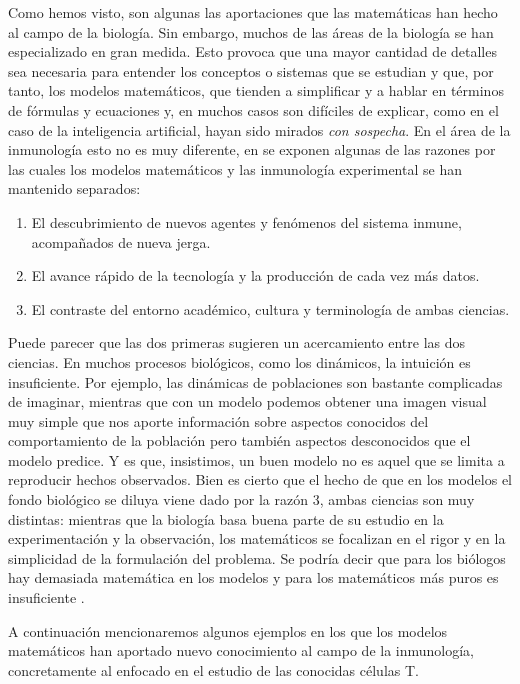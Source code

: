 Como hemos visto, son algunas las aportaciones que las matemáticas han hecho al campo de la biología. Sin embargo, muchos de las áreas de la biología se han especializado en gran medida. Esto provoca que una mayor cantidad de detalles sea necesaria para entender los conceptos o sistemas que se estudian y que, por tanto, los modelos matemáticos, que tienden a simplificar y a hablar en términos de fórmulas y ecuaciones y, en muchos casos son difíciles de explicar, como en el caso de la inteligencia artificial, hayan sido mirados \textit{con sospecha}. En el área de la inmunología esto no es muy diferente, en \cite{mathsModInmu} se exponen algunas de las razones por las cuales los modelos matemáticos y las inmunología experimental se han mantenido separados:

\begin{enumerate}
	\item El descubrimiento de nuevos agentes y fenómenos del sistema inmune, acompañados de nueva jerga.
	
	\item El avance rápido de la tecnología y la producción de cada vez más datos.
	
	\item El contraste del entorno académico, cultura y terminología de ambas ciencias.
\end{enumerate}

Puede parecer que las dos primeras sugieren un acercamiento entre las dos ciencias. En muchos procesos biológicos, como los dinámicos, la intuición es insuficiente. Por ejemplo, las dinámicas de poblaciones son bastante complicadas de imaginar, mientras que con un modelo podemos obtener una imagen visual muy simple que nos aporte información sobre aspectos conocidos del comportamiento de la población pero también aspectos desconocidos que el modelo predice. Y es que, insistimos, un buen modelo no es aquel que se limita a reproducir hechos observados. Bien es cierto que el hecho de que en los modelos el fondo biológico se diluya viene dado por la razón 3, ambas ciencias son muy distintas: mientras que la biología basa buena parte de su estudio en la experimentación y la observación, los matemáticos se focalizan en el rigor y en la simplicidad de la formulación del problema. Se podría decir que para los biólogos hay demasiada matemática en los modelos y para los matemáticos más puros es insuficiente \citep{RoleOfM}.

A continuación mencionaremos algunos ejemplos en los que los modelos matemáticos han aportado nuevo conocimiento al campo de la inmunología, concretamente al enfocado en el estudio de las conocidas células T. 


